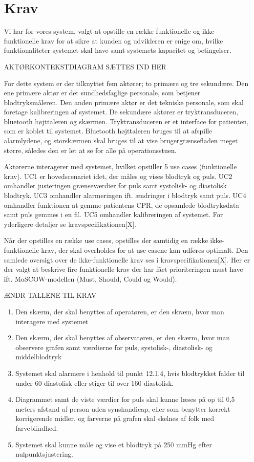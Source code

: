 \section{Krav}
Vi har for vores system, valgt at opstille en række funktionelle og ikke-funktionelle krav for at sikre at kunden og udvikleren er enige om, hvilke funktionaliteter systemet skal have samt systemets kapacitet og betingelser.

AKTØRKONTEKSTDIAGRAM SÆTTES IND HER


For dette system er der tilknyttet fem aktører; to primære og tre sekundære. Den ene primære aktør er det sundhedsfaglige personale, som betjener blodtryksmåleren. Den anden primære aktør er det tekniske personale, som skal foretage kalibreringen af systemet. De sekundære aktører er tryktransduceren, bluetooth højttaleren og skærmen. Tryktransduceren er et interface for patienten, som er koblet til systemet. Bluetooth højttaleren bruges til at afspille alarmlydene, og storskærmen skal bruges til at vise brugergrænsefladen meget større, således den er let at se for alle på operationsstuen.


Aktørerne interagerer med systemet, hvilket opstiller 5 use cases (funktionelle krav). UC1 er hovedscenariet idet, der måles og vises blodtryk og puls.  UC2 omhandler justeringen grænseværdier for puls samt systolisk- og diastolisk blodtryk. UC3 omhandler alarmeringen ift. ændringer i blodtryk samt puls. UC4 omhandler funktionen at gemme patientens CPR, de opsamlede blodtryksdata samt puls gemmes i en fil. UC5 omhandler kalibreringen af systemet. For yderligere detaljer se kravspecifikationen[X]. 

Når der opstilles en række use cases, opstilles der samtidig en række ikke-funktionelle krav, der skal overholdes for at use casene kan udføres optimalt. Den samlede oversigt over de ikke-funktionelle krav ses i kravspecifikationen[X]. Her er der valgt at beskrive fire funktionelle krav der har fået prioriteringen must have ift. MoSCOW-modellen (Must, Should, Could og Would).

ÆNDR TALLENE TIL KRAV

\begin{enumerate}
\item Den skærm, der skal benyttes af operatøren, er den skræm, hvor man interagere med systemet \\
\item Den skærm, der skal benyttes af observatøren, er den skærm, hvor man observere grafen samt værdierne for puls, systolisk-, diastolisk- og middelblodtryk
\item Systemet skal alarmere i henhold til punkt 12.1.4, hvis blodtrykket falder til under 60 diastolisk eller stiger til over 160 diastolisk. \\
\item Diagrammet samt de viste værdier for puls skal kunne læses på op til 0,5 meters afstand af person uden synshandicap, eller som benytter korrekt korrigerende midler, og farverne på grafen skal skelnes af folk med farveblindhed. 
\item Systemet skal kunne måle og vise et blodtryk på 250 mmHg efter nulpunktsjustering. 
\end{enumerate}

